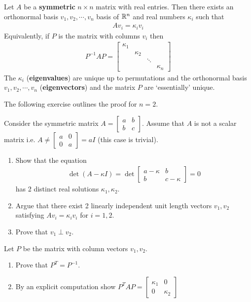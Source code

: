 \begin{thm}
	Let $ A$ be a \textbf{symmetric} $ n \times n$ matrix with real entries. Then there exists an orthonormal basis $ v_1, v_2, \cdots, v_n$ basis of $ \mathbb{R}^n$ and real numbers $ \kappa_i$ such that
	\begin{align*}
		A v_i = \kappa_i v_i
	\end{align*}
	Equivalently, if $P$ is the matrix with columns $ v_i$ then
	\begin{align*}
		P^{-1} A P =
		\begin{bmatrix} \kappa_1 &           &        &           \\
			          & \kappa_2 &        &           \\
			          &           & \ddots &           \\
			          &           &        & \kappa_n
		\end{bmatrix}
	\end{align*}
	The $ \kappa_i$ (\textbf{eigenvalues}) are unique up to permutations and the orthonormal basis $ v_1, v_2, \cdots, v_n$ (\textbf{eigenvectors}) and the matrix $ P$ are `essentially' unique.
\end{thm}
The following exercise outlines the proof for $n=2$.


\begin{ques}
	Consider the symmetric matrix $A = \begin{bmatrix} a & b \\ b & c\end{bmatrix}$. Assume that $A$ is not a scalar matrix i.e. $A \not= \begin{bmatrix} a & 0 \\ 0 & a\end{bmatrix}=aI$ (this case is trivial).
	\begin{enumerate}
		\item Show that the equation
		\begin{align*}
			\det(A - \kappa I) = \det \begin{bmatrix} a -\kappa & b \\ b & c - \kappa \end{bmatrix} = 0
		\end{align*}
		has 2 distinct real solutions $\kappa_1, \kappa_2$.
		\item Argue that there exist 2 linearly independent unit length vectors $v_1, v_2$ satisfying
		$ A v_i = \kappa_i v_i$
		for $i = 1, 2$.
		\item Prove that $v_1 \perp v_2$.
	\end{enumerate}
	Let $P$ be the matrix with column vectors $v_1, v_2$.
	\begin{enumerate}[resume]
		\item Prove that $P^T = P^{-1}$.
		\item By an explicit computation show $P^T A P = \begin{bmatrix} \kappa_1 & 0 \\ 0 & \kappa_2 \end{bmatrix}$
	\end{enumerate}
\end{ques}
